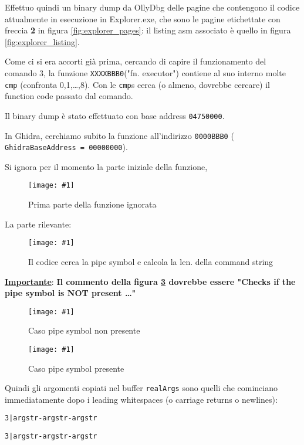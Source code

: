 \documentclass[
    a4paper, %
    11pt %
]{article}
\newcommand{\pic}[4]{\begin{figure}[H]
            \centering
            \texttt{[image: \#1]}
            \caption{#2}
            \label{fig:#1}
            \end{figure}}
\begin{document}
            Effettuo quindi un binary dump da OllyDbg delle pagine che contengono il codice attualmente in esecuzione
            in Explorer.exe, che sono le pagine etichettate con freccia \textbf{2} in figura 
            \ref{fig:explorer_pages}: il listing asm associato è quello in figura \ref{fig:explorer_listing}.

            Come ci si era accorti già prima, cercando di capire il funzionamento del comando 3, la
            funzione \texttt{XXXXBBB0}("fn. executor") contiene al suo interno molte \texttt{cmp} (confronta 0,1,\dots,8).
            Con le \texttt{cmp}s cerca (o almeno, dovrebbe cercare) il function code passato dal comando.

            Il binary dump è stato effettuato con base address \texttt{04750000}.

            In Ghidra, cerchiamo subito la funzione all'indirizzo \texttt{0000BBB0} (\texttt{
            GhidraBaseAddress = 00000000}).

            Si ignora per il momento la parte iniziale della funzione,

            \pic{adv_ignore}{Prima parte della funzione ignorata}{13cm}{10cm}

            La parte rilevante:

            \pic{adv_p1}{Il codice cerca la pipe symbol e calcola la len. della command string}{16cm}{6cm}

            \pagebreak

            \underline{\textbf{Importante}}: \textbf{Il commento della figura \ref{fig:adv_p2}
            dovrebbe essere "Checks if the pipe symbol is NOT present \dots"}
            
            \pic{adv_p2}{Caso pipe symbol non presente}{17.5cm}{5cm}
            
            \pic{adv_p3}{Caso pipe symbol presente}{17cm}{10cm}

            Quindi gli argomenti copiati nel buffer \texttt{realArgs} sono quelli che cominciano 
            immediatamente dopo i  leading whitespaces (o carriage returns o newlines):

            \begin{center}

            \texttt{3|\;\;\;\;\;\;\;\;\;\;argstr-argstr-argstr}
            
            \texttt{3|argstr-argstr-argstr}
            
            \end{center}
\end{document}
